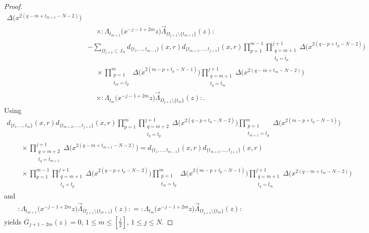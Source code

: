 \documentclass[10pt,a4paper]{amsart}
\numberwithin{equation}{section}
\begin{document}
\begin{proof}
\begin{align*}
\Delta\big(x^{2(q-m+t_{m+1}-N-2)}\big)
\\
&\phantom{-}\times{:}\Lambda_{t_{m+1}}\big(x^{-j-1+2m}z\big)
\overrightarrow{\Lambda}_{\Omega_{j+1}\setminus \{t_{m+1}\}}(z){:}
\\
&-\sum_{\Omega_{j+1}\subset J_N}\!\!\!
d_{\{t_1,\dots,t_{m-1}\}}(x,r) d_{\{t_{m+1},\dots,t_{j+1}\}}(x,r)
\prod_{p=1}^{m-1}\! \prod\limits_{\substack{q=m+1
\\t_q=\overline{t}_p}}^{j+1}\!\!\!\Delta\big(x^{2(q-p+t_p-N-2)}\big)
\\
&\phantom{-}\times\prod\limits_{\substack{p=1\\t_{m}=\overline{t}_p}}^m
\Delta\big(x^{2(m-p+t_p-N-1)}\big)\prod\limits_{\substack{q=m+1\\t_q=\overline{t}_{m}}}^{j+1}
\Delta\big(x^{2(q-m+t_{m}-N-2)}\big)
\\
&\phantom{-}\times{:}\Lambda_{t_{m}}\big(x^{-j-1+2m}z\big)
\overrightarrow{\Lambda}_{\Omega_{j+1}\setminus \{t_{m}\}}(z){:}.
\end{align*}
Using
\begin{gather*}
d_{\{t_1,\dots,t_m\}}(x,r) d_{\{t_{m+2},\dots,t_{j+1}\}}(x,r)
\prod_{p=1}^m \prod\limits_{\substack{q=m+2\\t_q=\overline{t}_p}}^{j+1}
\Delta\big(x^{2(q-p+t_p-N-2)}\big)
\prod\limits_{\substack{p=1\\t_{m+1}=\overline{t}_p}}^m
\Delta\big(x^{2(m-p+t_p-N-1)}\big)
\\ \qquad
{}\times\prod\limits_{\substack{q=m+2\\t_q=\overline{t}_{m+1}}}^{j+1}
\Delta\big(x^{2(q-m+t_{m+1}-N-2)}\big)
=d_{\{t_1,\dots,t_{m-1}\}}(x,r) d_{\{t_{m+1},\dots,t_{j+1}\}}(x,r)
\\ \qquad
{}\times
\prod_{p=1}^{m-1} \prod\limits_{\substack{q=m+1
\\t_q=\overline{t}_p}}^{j+1}\!
\Delta\big(x^{2(q-p+t_p-N-2)}\big)\!
\prod\limits_{\substack{p=1
\\t_{m}=\overline{t}_p}}^m\Delta\big(x^{2(m-p+t_p-N-1)}\big)
\prod\limits_{\substack{q=m+1\\t_q=\overline{t}_{m}}}^{j+1}
\Delta\big(x^{2(q-m+t_{m}-N-2)}\big)
\end{gather*}
and
\begin{gather*}
{:}\Lambda_{t_{m+1}}\big(x^{-j-1+2m}z\big)
\overrightarrow{\Lambda}_{\Omega_{j+1}\setminus \{t_{m+1}\}}(z){:}
={:}\Lambda_{t_{m}}\big(x^{-j-1+2m}z\big)
\overrightarrow{\Lambda}_{\Omega_{j+1}\setminus \{t_{m}\}}(z){:}
\end{gather*}
yields
$\overline{G}_{j+1-2m}(z)=0$, $1\leq m \leq [\frac{j}{2}]$, $1\leq j \leq N$.


\end{proof}
\end{document}
